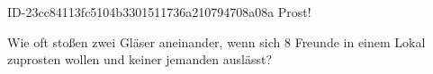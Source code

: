 \begin{exercise}
      {ID-23cc84113fc5104b3301511736a210794708a08a}
      {Prost!}
  \ifproblem\problem\par
    Wie oft stoßen zwei Gläser aneinander, wenn sich 8 Freunde in einem Lokal
    zuprosten wollen und keiner jemanden auslässt?
  \fi
\end{exercise}
